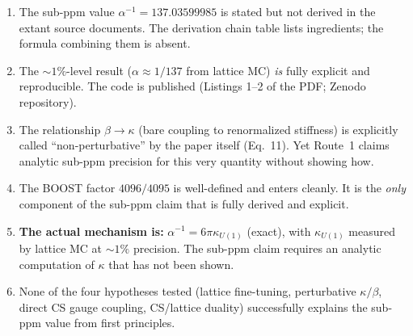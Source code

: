 \documentclass[12pt,a4paper]{article}
\begin{document}
\begin{enumerate}
\item The sub-ppm value $\alpha^{-1} = 137.03599985$ is stated but
  not derived in the extant source documents. The derivation chain
  table lists ingredients; the formula combining them is absent.

\item The $\sim 1\%$-level result ($\alpha \approx 1/137$ from
  lattice MC) \emph{is} fully explicit and reproducible.
  The code is published (Listings 1--2 of the PDF; Zenodo repository).

\item The relationship $\beta \to \kappa$ (bare coupling to
  renormalized stiffness) is explicitly called ``non-perturbative''
  by the paper itself (Eq.~11). Yet Route~1 claims analytic
  sub-ppm precision for this very quantity without showing how.

\item The BOOST factor $4096/4095$ is well-defined and enters
  cleanly. It is the \emph{only} component of the sub-ppm claim
  that is fully derived and explicit.

\item \textbf{The actual mechanism is:} $\alpha^{-1} = 6\pi\kappa_{U(1)}$
  (exact), with $\kappa_{U(1)}$ measured by lattice MC at $\sim 1\%$
  precision. The sub-ppm claim requires an analytic computation of
  $\kappa$ that has not been shown.

\item None of the four hypotheses tested (lattice fine-tuning,
  perturbative $\kappa/\beta$, direct CS gauge coupling, CS/lattice
  duality) successfully explains the sub-ppm value from first
  principles.
\end{enumerate}
\end{document}
